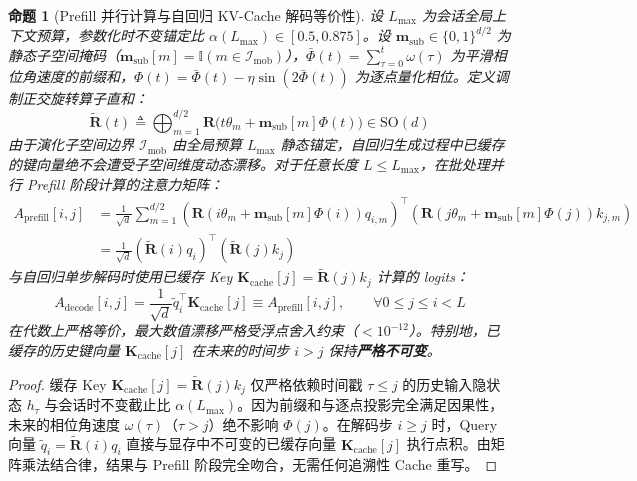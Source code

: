 \documentclass[11pt,a4paper]{article}
\newtheorem{proposition}[theorem]{命题}
\theoremstyle{definition}
\begin{document}
\begin{proposition}[Prefill 并行计算与自回归 KV-Cache 解码等价性]
\label{prop:kv_cache}
设 $L_{\max}$ 为会话全局上下文预算，参数化时不变锚定比 $\alpha(L_{\max}) \in [0.5, 0.875]$。设 $\mathbf{m}_{\text{sub}} \in \{0, 1\}^{d/2}$ 为静态子空间掩码（$\mathbf{m}_{\text{sub}}[m] = \mathbb{I}(m \in \mathcal{I}_{\text{mob}})$），$\bar{\Phi}(t) = \sum_{\tau=0}^t \omega(\tau)$ 为平滑相位角速度的前缀和，$\Phi(t) = \bar{\Phi}(t) - \eta\sin(2\bar{\Phi}(t))$ 为逐点量化相位。定义调制正交旋转算子直和：
\begin{equation}
\tilde{\mathbf{R}}(t) \triangleq \bigoplus_{m=1}^{d/2} \mathbf{R}\big(t\theta_m + \mathbf{m}_{\text{sub}}[m]\Phi(t)\big) \in \mathrm{SO}(d)
\end{equation}
由于演化子空间边界 $\mathcal{I}_{\text{mob}}$ 由全局预算 $L_{\max}$ 静态锚定，自回归生成过程中已缓存的键向量绝不会遭受子空间维度动态漂移。对于任意长度 $L \le L_{\max}$，在批处理并行 Prefill 阶段计算的注意力矩阵：
\begin{align}
A_{\mathrm{prefill}}[i, j] &= \frac{1}{\sqrt{d}} \sum_{m=1}^{d/2} \left( \mathbf{R}(i\theta_m + \mathbf{m}_{\text{sub}}[m]\Phi(i)) q_{i,m} \right)^\top \left( \mathbf{R}(j\theta_m + \mathbf{m}_{\text{sub}}[m]\Phi(j)) k_{j,m} \right) \nonumber \\
&= \frac{1}{\sqrt{d}} \left( \tilde{\mathbf{R}}(i) q_i \right)^\top \left( \tilde{\mathbf{R}}(j) k_j \right)
\end{align}
与自回归单步解码时使用已缓存 Key $\mathbf{K}_{\mathrm{cache}}[j] = \tilde{\mathbf{R}}(j) k_j$ 计算的 logits：
\begin{equation}
A_{\mathrm{decode}}[i, j] = \frac{1}{\sqrt{d}} \tilde{q}_i^\top \mathbf{K}_{\mathrm{cache}}[j] \equiv A_{\mathrm{prefill}}[i, j], \qquad \forall 0 \le j \le i < L
\end{equation}
在代数上严格等价，最大数值漂移严格受浮点舍入约束（$< 10^{-12}$）。特别地，已缓存的历史键向量 $\mathbf{K}_{\mathrm{cache}}[j]$ 在未来的时间步 $i > j$ 保持\textbf{严格不可变}。
\end{proposition}
\begin{proof}
缓存 Key $\mathbf{K}_{\mathrm{cache}}[j] = \tilde{\mathbf{R}}(j) k_j$ 仅严格依赖时间戳 $\tau \le j$ 的历史输入隐状态 $h_\tau$ 与会话时不变截止比 $\alpha(L_{\max})$。因为前缀和与逐点投影完全满足因果性，未来的相位角速度 $\omega(\tau)$（$\tau > j$）绝不影响 $\Phi(j)$。在解码步 $i \ge j$ 时，Query 向量 $\tilde{q}_i = \tilde{\mathbf{R}}(i) q_i$ 直接与显存中不可变的已缓存向量 $\mathbf{K}_{\mathrm{cache}}[j]$ 执行点积。由矩阵乘法结合律，结果与 Prefill 阶段完全吻合，无需任何追溯性 Cache 重写。
\end{proof}
\end{document}
